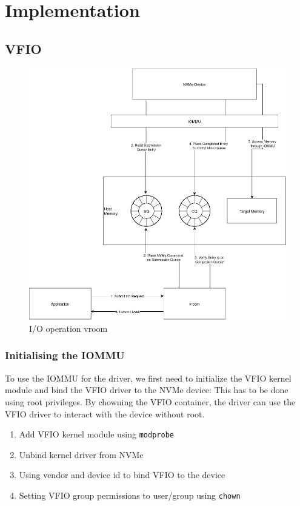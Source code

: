 \chapter{Implementation}

\section{VFIO}

\begin{figure}
    \centering
    \includegraphics[width=\textwidth]{figures/vroomgraphlight.png}
    \caption{I/O operation vroom}
    \label{fig:vroom-graph}
\end{figure}

\subsection{Initialising the IOMMU}

To use the IOMMU for the driver, we first need to initialize the VFIO kernel module and bind the VFIO driver to the NVMe device:
This has to be done using root privileges. By chowning the VFIO container, the driver can use the VFIO driver to interact with the device without root.

\begin{enumerate}
    \item Add VFIO kernel module using \texttt{modprobe}
    \item Unbind kernel driver from NVMe
    \item Using vendor and device id to bind VFIO to the device
    \item Setting VFIO group permissions to user/group using \texttt{chown}
\end{enumerate}

